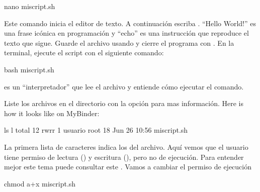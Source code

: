 \documentclass[letterpaper,10pt,english]{jupyterBook}
\begin{document}
\begin{sphinxVerbatim}[commandchars=\\\{\}]
\PYGZdl{} nano miscript.sh
\end{sphinxVerbatim}

\sphinxAtStartPar
Este comando inicia el editor de texto. A continuación escriba . “Hello World!” es una frase icónica en programación y “echo” es una instrucción que reproduce el texto que sigue. Guarde el archivo usando   y cierre el programa con . En la terminal, ejecute el script con el siguiente comando:

\begin{sphinxVerbatim}[commandchars=\\\{\}]
\PYGZdl{} bash miscript.sh
\end{sphinxVerbatim}

\sphinxAtStartPar
{} es un “interpretador” que lee el archivo y entiende cómo ejecutar el comando.

\begin{DUlineblock}{0em}
\item[] 
\end{DUlineblock}

\sphinxAtStartPar
Liste los archivos en el directorio con la opción  para mas información. Here is how it looks like on MyBinder:

\begin{sphinxVerbatim}[commandchars=\\\{\}]
\PYGZdl{} ls \PYGZhy{}l
total 12
\PYGZhy{}rw\PYGZhy{}r\PYGZhy{}\PYGZhy{}r\PYGZhy{}\PYGZhy{} 1 usuario root   18 Jun 26 10:56 miscript.sh
\end{sphinxVerbatim}

\sphinxAtStartPar
La primera lista de caracteres indica los  del archivo. Aquí vemos que el usuario tiene permiso de lectura () y escritura (), pero no de ejecución.
Para entender mejor este tema puede consultar este . Vamos a cambiar el permiso de ejecución

\begin{sphinxVerbatim}[commandchars=\\\{\}]
\PYGZdl{} chmod a+x miscript.sh
\end{sphinxVerbatim}
\end{document}

